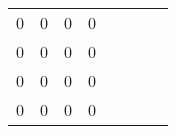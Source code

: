 \begin{table}[ht]
\begin{tabular}{rrrlrrrr}
        0      & 0          & 0  & 0  &                                                            &                                                            &                                                            &           \\ \cline{1-4}
        0      & 0          & 0  & 0  &                                                            &                                                            &                                                            &           \\ \cline{1-4}
        0      & 0          & 0  & 0  &                                                            &                                                            &                                                            &           \\ \cline{1-4}
        0      & 0          & 0  & 0  &                                                            &                                                            &                                                            &           \\ \hline
    \end{tabular}
\end{table}

